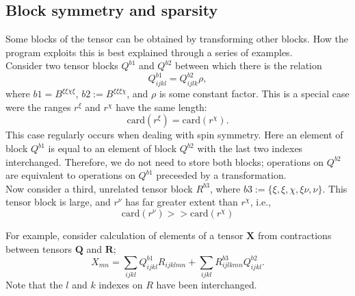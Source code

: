 \documentclass[12pt]{article}
\begin{document}
\subsection { Block symmetry and sparsity }

Some blocks of the tensor can be obtained by transforming other blocks. How the program exploits this is best explained
through a series of examples.\\ 

\noindent Consider two tensor blocks $Q^{b1}$ and $Q^{b2}$ between which there is the relation
\begin{equation}
Q^{b1}_{ijkl} = Q^{b2}_{ijlk}\rho,
\label{eqn:Qsymm}
\end{equation}
where $b1 = B^{\xi\xi\chi\xi }$, $b2 := B^{\xi\xi\xi\chi }$, and $\rho$ is some constant factor. This is a special case were the ranges $r^{\xi}$ and $r^{\chi}$ have
the same length:
\begin{equation}
\text{card}(r^{\xi}) = \text{card}(r^{\chi}).
\end{equation}
This case regularly occurs when dealing with spin symmetry. Here an element of block $Q^{b1}$ is equal to an element of block $Q^{b2}$ with the last two indexes interchanged.
Therefore, we do not need to store both blocks; operations on $Q^{b2}$ are equivalent to operations on $Q^{b1}$ preceeded by a transformation.\\

\noindent Now consider a third, unrelated tensor block $R^{b3}$, where $b3 := \{\xi, \xi, \chi, \xi \nu, \nu \}$. 
This tensor block is large, and $r^{\nu}$ has far greater extent than $r^{\chi}$, i.e.,
\begin{equation}
\text{card}(r^{\nu}) >> \text{card}(r^{\chi})
\end{equation}

\noindent For example, consider calculation of elements of a tensor $\mathbf{X}$ from contractions between tensors $\mathbf{Q}$ and $\mathbf{R}$;
\begin{equation}
X_{mn} = \sum_{ijkl} Q^{b1}_{ijkl} R_{ijklmn}+ \sum_{ijkl} R^{b3}_{ijlkmn}Q^{b2}_{ijkl}.
\label{eqn:Xexample}
\end{equation} 
Note that the $l$ and $k$ indexes on $R$ have been interchanged. \\
\end{document}
